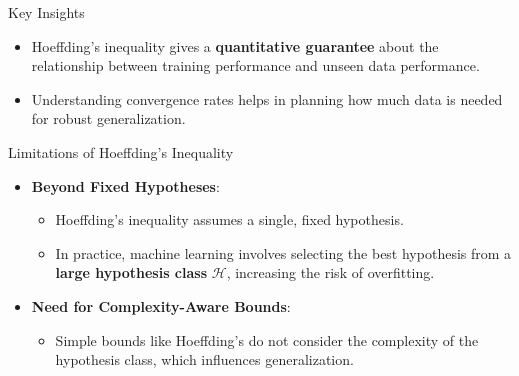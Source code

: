 \documentclass[
  ignorenonframetext,
]{beamer}
\providecommand{\tightlist}{%
  \setlength{\itemsep}{0pt}\setlength{\parskip}{0pt}}\usepackage{longtable,booktabs,array}
\begin{document}
\begin{frame}
\begin{block}{Key Insights}
\label{key-insights-2}
\begin{itemize}
\tightlist
\item
  Hoeffding's inequality gives a \textbf{quantitative guarantee} about
  the relationship between training performance and unseen data
  performance.
\item
  Understanding convergence rates helps in planning how much data is
  needed for robust generalization.
\end{itemize}
\end{block}
\end{frame}

\begin{frame}{Limitations of Hoeffding's Inequality}
\label{limitations-of-hoeffdings-inequality}
\begin{itemize}
\tightlist
\item
  \textbf{Beyond Fixed Hypotheses}:

  \begin{itemize}
  \tightlist
  \item
    Hoeffding's inequality assumes a single, fixed hypothesis.
  \item
    In practice, machine learning involves selecting the best hypothesis
    from a \textbf{large hypothesis class} \(\mathcal{H}\), increasing
    the risk of overfitting.
  \end{itemize}
\item
  \textbf{Need for Complexity-Aware Bounds}:

  \begin{itemize}
  \tightlist
  \item
    Simple bounds like Hoeffding's do not consider the complexity of the
    hypothesis class, which influences generalization.
  \end{itemize}
\end{itemize}
\end{frame}
\end{document}

